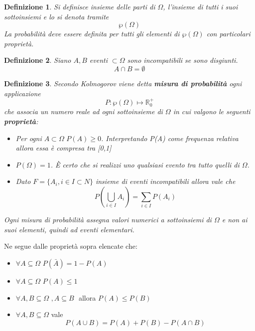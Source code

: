 \documentclass{article}
\newtheorem{definition}{Definizione}[section]
\begin{document}
            \begin{definition}{} 
                Si definisce insieme delle parti di $\Omega$, l'insieme di tutti i suoi sottoinsiemi e lo si denota tramite $$\wp(\Omega)$$
                La probabilità deve essere definita per tutti gli elementi di $\wp(\Omega)$ con particolari proprietà. 
            \end{definition}{} 
            
            \begin{definition}{} 
                Siano  $A, B$  eventi $\subset \Omega$ sono incompatibili se sono disgiunti. \\
                $$ A \cap B = \emptyset$$
            \end{definition}{} 
            
             \begin{definition}{}
             Secondo Kolmogorov viene detta \textbf{misura di probabilità} ogni applicazione
             $$P\colon \wp(\Omega)\mapsto \mathbb{R}^+_0$$
             che associa un numero reale ad ogni sottoinsieme di $\Omega$ in cui valgono le seguenti \textbf{proprietà}:
             \begin{itemize}
                 \item Per ogni $A\subset \Omega\,\, P(A)\geq0$. Interpretando P(A) come frequenza relativa allora essa è compresa tra [0,1]
                 \item $P(\Omega) = 1$. È certo che si realizzi uno qualsiasi evento tra tutto quelli di $\Omega$. 
                 \item Dato $F=\{A_i, i \in I \subset N \}$ insieme di eventi incompatibili allora vale che
                 $$ P\left(\bigcup_{i\in I} A_i\right) = \sum_{i\in I} P(A_i)$$ 
             \end{itemize}{}
             Ogni misura di probabilità assegna valori numerici a sottoinsiemi di $\Omega$ e non ai suoi elementi, quindi ad eventi elementari. 
            \end{definition}{} 
            
            Ne segue dalle proprietà sopra elencate che: 
            \begin{itemize}
                \item $\forall A \subseteq \Omega\,\, P(\bar{A}) = 1 - P(A)$
                \item $\forall  A \subseteq \Omega\,\, P(A)\leq 1$
                \item $ \forall A,B \subseteq \Omega\,\,, A \subseteq B\,\,$ allora $P(A)\leq P(B) $
                \item $\forall A,B \subseteq \Omega$ vale 
                $$P(A\cup B)=P(A)+P(B) - P(A\cap B)$$
            \end{itemize}{}
            
\end{document}
